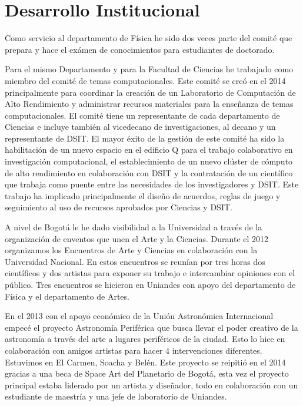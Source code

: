 \documentclass{report}
\begin{document}
\section{Desarrollo Institucional}

Como servicio al departamento de Física he sido dos veces parte del
comité que prepara y hace el exámen de conocimientos para estudiantes
de doctorado. 

Para el mismo Departamento y para la Facultad de Ciencias he trabajado
como miembro del comité de temas computacionales. Este comité se creó
en el 2014 principalmente para coordinar la creación de un Laboratorio
de Computación de Alto Rendimiento y administrar recursos materiales
para la enseñanza de temas computacionales. El comité tiene un
representante de cada departamento de Ciencias e incluye también al vicedecano
de investigaciones, al decano y un representante de DSIT. El mayor éxito de la
gestión de este comité ha sido la habilitación de un nuevo espacio en el edificio Q
para el trabajo colaborativo en investigación computacional, el
establecimiento de un nuevo clúster de cómputo de alto rendimiento en
colaboración con DSIT y la contratación de un científico que trabaja
como puente entre las necesidades de los investigadores y DSIT. Este
trabajo ha implicado principalmente el diseño de acuerdos, reglas de
juego y seguimiento al uso de recursos aprobados por Ciencias y DSIT.

A nivel de Bogotá le he dado visibilidad a la Universidad a través de
la organización de enventos que unen el Arte y la Ciencias. Durante el
2012 organizamos los Encuentros de Arte y Ciencias en colaboración con
la Universidad Nacional. En estos encuentros se reunían por tres horas
dos científicos y dos artistas para exponer su trabajo e intercambiar
opiniones con el público. Tres encuentros se hicieron en Uniandes con
apoyo del departamento de Física y el departamento de Artes.

En el 2013 con el apoyo económico de la Unión Astronómica
Internacional empecé el proyecto Astronomía Periférica que busca
llevar el poder creativo de la astronomía a través del arte a lugares
periféricos de la ciudad. Esto lo hice en colaboración con amigos
artistas para hacer 4 intervenciones diferentes. Estuvimos en El
Carmen, Soacha y Belén. Este proyecto se reipitió en el 2014 gracias a
una beca de Space Art del Planetario de Bogotá, esta vez el proyecto
principal estaba liderado por un artista y diseñador, todo en
colaboración con un estudiante de maestría y una jefe de laboratorio
de Uniandes.
\end{document}
